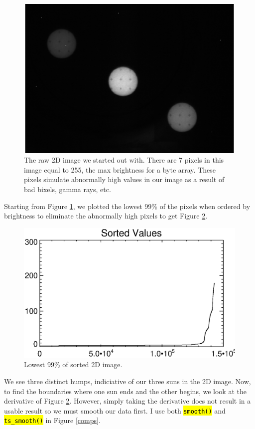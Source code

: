 \documentclass[10pt]{article}
\begin{document}
\begin{figure}[!ht]
    \centering
    \includegraphics[width=.9\textwidth]{plots_tables_images/raw.eps}
    \caption{The raw 2D image we started out with. There are 7 pixels in this image equal to 255, the max brightness for a byte array. These pixels simulate abnormally high values in our image as a result of bad bixels, gamma rays, etc.}
    \label{raw}
\end{figure}

Starting from Figure \ref{raw}, we plotted the lowest 99\% of the pixels when ordered by brightness to eliminate the abnormally high pixels to get Figure \ref{sorted}.

\begin{figure}[!ht]
    \centering
    \includegraphics[width=.9\textwidth]{plots_tables_images/sorted_array.eps}
    \caption{Lowest 99\% of sorted 2D image.}
    \label{sorted}
\end{figure}

We see three distinct humps, indiciative of our three suns in the 2D image. Now, to find the boundaries where one sun ends and the other begins, we look at the derivative of Figure \ref{sorted}. However, simply taking the derivative does not result in a usable result so we must smooth our data first. I use both \texttt{\hl{smooth()}} and \texttt{\hl{ts\_smooth()}} in Figure \ref{comps}.
\end{document}
